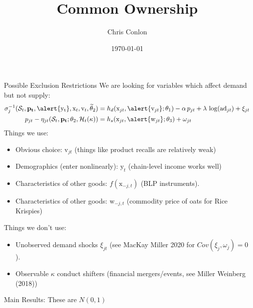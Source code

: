 

\usepackage{tabularx}
\usepackage{dcolumn}
\usepackage{ragged2e}
\usepackage{multirow,multicol,dcolumn}





\title{Common Ownership}
\author{Chris Conlon}
\date{\today}

\frame{\titlepage}


\begin{frame}{Possible Exclusion Restrictions}
We are looking for variables which affect \alert{demand but not supply}:
\begin{align*}
\sigma_{j}^{-1}(\mathcal{S}_t, \mathbf{p_t},\alert{\mathrm{y_t}}, \mathrm{x}_t,  \mathrm{v}_t, \widetilde{\theta}_2) 
&= h_d(\mathrm{x}_{jt},\alert{ \mathrm{v}_{jt}}; \theta_1) - \alpha\, p_{jt} + \lambda \, \log(\text{ad}_{jt})+ \xi_{jt} \\
p_{jt} - \eta_{jt}(\mathcal{S}_t, \mathbf{p_t}; \theta_2, \mathcal{H}_t(\kappa))
&= h_s(\textrm{x}_{jt}, \alert{\mathrm{w}_{jt}}; \theta_3) + \omega_{jt} 
\end{align*}
Things we use:
\begin{itemize}
    \item Obvious choice: $\mathrm{v}_{jt}$ (things like product recalls are relatively weak)
    \item Demographics (enter nonlinearly): $\mathrm{y}_t$ (chain-level income works well)
    \item Characteristics of other goods: $f(\mathrm{x}_{-j,t})$ (BLP instruments).
    \item Characteristics of other goods: $\mathrm{w}_{-j,t}$ (commodity price of oats for Rice Krispies)
\end{itemize}

Things we don't use:
\begin{itemize}
    \item Unobserved demand shocks $\xi_{jt}$ (see MacKay Miller 2020 for $Cov(\xi_j,\omega_j)=0$).
    \item Observable $\kappa$ conduct shifters (financial mergers/events, see Miller Weinberg (2018))
\end{itemize}
\end{frame}


\begin{frame}[plain,label=mainresults]{Main Results: These are $N(0,1)$}
\begin{center}
\scalebox{0.55}{}
\end{center}
\end{frame}

